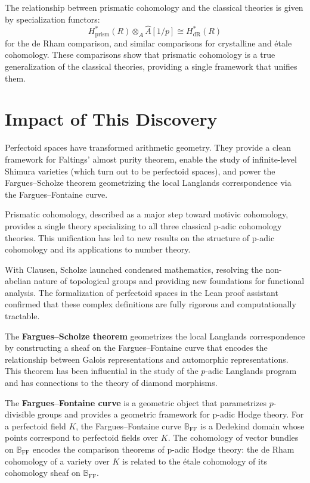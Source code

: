 The relationship between prismatic cohomology and the classical theories is given by specialization functors:
\[
H^*_{\mathrm{prism}}(R) \otimes_A \widehat{A}[1/p] \cong H^*_{\mathrm{dR}}(R)
\]
for the de Rham comparison, and similar comparisons for crystalline and \'{e}tale cohomology. These comparisons show that prismatic cohomology is a true generalization of the classical theories, providing a single framework that unifies them.

\section{Impact of This Discovery}

Perfectoid spaces have transformed arithmetic geometry. They provide a clean framework for Faltings' almost purity theorem, enable the study of infinite-level Shimura varieties (which turn out to be perfectoid spaces), and power the Fargues--Scholze theorem geometrizing the local Langlands correspondence via the Fargues--Fontaine curve.

Prismatic cohomology, described as a major step toward motivic cohomology, provides a single theory specializing to all three classical p-adic cohomology theories. This unification has led to new results on the structure of p-adic cohomology and its applications to number theory.

With Clausen, Scholze launched condensed mathematics, resolving the non-abelian nature of topological groups and providing new foundations for functional analysis. The formalization of perfectoid spaces in the Lean proof assistant confirmed that these complex definitions are fully rigorous and computationally tractable.

The \textbf{Fargues--Scholze theorem} geometrizes the local Langlands correspondence by constructing a sheaf on the Fargues--Fontaine curve that encodes the relationship between Galois representations and automorphic representations. This theorem has been influential in the study of the $p$-adic Langlands program and has connections to the theory of diamond morphisms.

The \textbf{Fargues--Fontaine curve} is a geometric object that parametrizes $p$-divisible groups and provides a geometric framework for p-adic Hodge theory. For a perfectoid field $K$, the Fargues--Fontaine curve $\mathbb{B}_{\mathrm{FF}}$ is a Dedekind domain whose points correspond to perfectoid fields over $K$. The cohomology of vector bundles on $\mathbb{B}_{\mathrm{FF}}$ encodes the comparison theorems of p-adic Hodge theory: the de Rham cohomology of a variety over $K$ is related to the \'{e}tale cohomology of its cohomology sheaf on $\mathbb{B}_{\mathrm{FF}}$.

